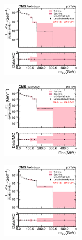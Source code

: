       \begin{figure}[htp!]
        \begin{subfigure}
          \centering
          \includegraphics[width=0.45\textwidth]{figures/multijet/unfolding/trijet/closure_binnedResult_groomed_0.pdf}
        \end{subfigure} 
        \begin{subfigure}
          \centering
          \includegraphics[width=0.45\textwidth]{figures/multijet/unfolding/trijet/closure_binnedResult_groomed_1.pdf}
        \end{subfigure}
        \begin{subfigure}
          \centering
          \includegraphics[width=0.45\textwidth]{figures/multijet/unfolding/trijet/closure_binnedResult_groomed_2.pdf}
        \end{subfigure} 
        \begin{subfigure}

\end{subfigure}
\end{figure}
